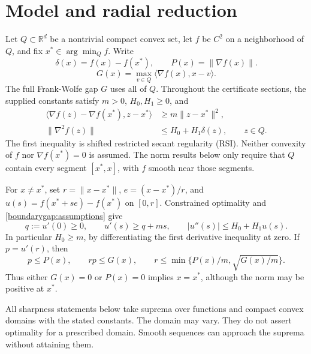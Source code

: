 \section{Model and radial reduction}
\label{compact:assumptions}\label{sec:model}
Let $Q\subset\mathbb R^d$ be a nontrivial compact convex set, let
$f$ be $C^2$ on a neighborhood of $Q$, and fix $x^*\in\arg\min_Q f$.
Write
\[
 \delta(x)=f(x)-f(x^*),\qquad
 P(x)=\|\nabla f(x)\|.
\]
\begin{equation}\label{eq:gap}
 G(x)=\max_{v\in Q}\langle\nabla f(x),x-v\rangle.
\end{equation}
The full Frank-Wolfe gap $G$ uses all of $Q$. Throughout the certificate
sections, the supplied constants satisfy $m>0$, $H_0,H_1\ge0$, and
\begin{equation}\label{boundarygap:assumptions}
 \begin{aligned}
 \langle\nabla f(z)-\nabla f(x^*),z-x^*\rangle
   &\ge m\|z-x^*\|^2,\\
 \|\nabla^2 f(z)\|&\le H_0+H_1\delta(z),\qquad z\in Q.
 \end{aligned}
\end{equation}
The first inequality is shifted restricted secant regularity (RSI).
Neither convexity of $f$ nor $\nabla f(x^*)=0$ is assumed.
The norm results below only require that $Q$ contain every segment
$[x^*,x]$, with $f$ smooth near those segments.

For $x\ne x^*$, set $r=\|x-x^*\|$, $e=(x-x^*)/r$, and
$u(s)=f(x^*+se)-f(x^*)$ on $[0,r]$. Constrained optimality and
\eqref{boundarygap:assumptions} give
\begin{equation}\label{compact:radial-data}
 q:=u'(0)\ge0,\qquad u'(s)\ge q+ms,\qquad
 |u''(s)|\le H_0+H_1u(s).
\end{equation}
In particular $H_0\ge m$, by differentiating the first derivative
inequality at zero. If $p=u'(r)$, then
\begin{equation}\label{compact:observed-caps}
 p\le P(x),\qquad rp\le G(x),\qquad
 r\le\min\{P(x)/m,\sqrt{G(x)/m}\}.
\end{equation}
Thus either $G(x)=0$ or $P(x)=0$ implies $x=x^*$, although the norm
may be positive at $x^*$.

All sharpness statements below take suprema over functions and compact
convex domains with the stated constants. The domain may vary. They do
not assert optimality for a prescribed domain. Smooth
sequences can approach the suprema without attaining them.
